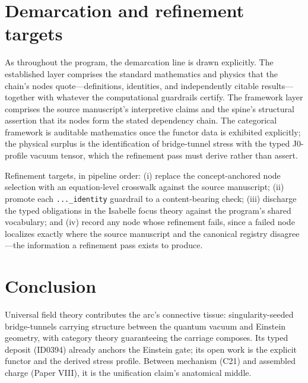 \documentclass[11pt]{article}
\theoremstyle{remark}
\begin{document}
\section{Demarcation and refinement targets}
\label{sec:demarc}

As throughout the program, the demarcation line is drawn explicitly. The established layer comprises the standard mathematics and physics that the chain's nodes quote---definitions, identities, and independently citable results---together with whatever the computational guardrails certify. The framework layer comprises the source manuscript's interpretive claims and the spine's structural assertion that its nodes form the stated dependency chain. The categorical framework is auditable mathematics once the functor data is exhibited explicitly; the physical surplus is the identification of bridge-tunnel stress with the typed J0-profile vacuum tensor, which the refinement pass must derive rather than assert.

Refinement targets, in pipeline order: (i) replace the concept-anchored node selection with an equation-level crosswalk against the source manuscript; (ii) promote each \texttt{...\_identity} guardrail to a content-bearing check; (iii) discharge the typed obligations in the Isabelle focus theory against the program's shared vocabulary; and (iv) record any node whose refinement fails, since a failed node localizes exactly where the source manuscript and the canonical registry disagree---the information a refinement pass exists to produce.

\section{Conclusion}
\label{sec:conc}

Universal field theory contributes the arc's connective tissue: singularity-seeded bridge-tunnels carrying structure between the quantum vacuum and Einstein geometry, with category theory guaranteeing the carriage composes. Its typed deposit (ID0394) already anchors the Einstein gate; its open work is the explicit functor and the derived stress profile. Between mechanism (C21) and assembled charge (Paper VIII), it is the unification claim's anatomical middle.
\end{document}
